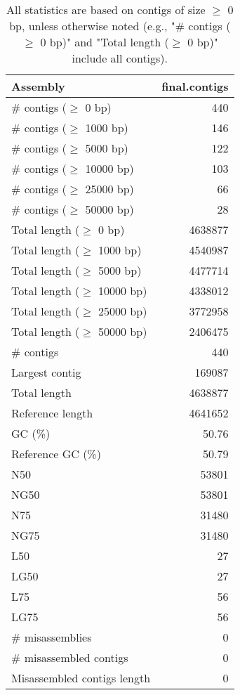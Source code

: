 \documentclass[12pt,a4paper]{article}
\begin{document}
\begin{table}[ht]
\begin{center}
\caption{All statistics are based on contigs of size $\geq$ 0 bp, unless otherwise noted (e.g., "\# contigs ($\geq$ 0 bp)" and "Total length ($\geq$ 0 bp)" include all contigs).}
\begin{tabular}{|l*{1}{|r}|}
\hline
Assembly & final.contigs \\ \hline
\# contigs ($\geq$ 0 bp) & 440 \\ \hline
\# contigs ($\geq$ 1000 bp) & 146 \\ \hline
\# contigs ($\geq$ 5000 bp) & 122 \\ \hline
\# contigs ($\geq$ 10000 bp) & 103 \\ \hline
\# contigs ($\geq$ 25000 bp) & 66 \\ \hline
\# contigs ($\geq$ 50000 bp) & 28 \\ \hline
Total length ($\geq$ 0 bp) & 4638877 \\ \hline
Total length ($\geq$ 1000 bp) & 4540987 \\ \hline
Total length ($\geq$ 5000 bp) & 4477714 \\ \hline
Total length ($\geq$ 10000 bp) & 4338012 \\ \hline
Total length ($\geq$ 25000 bp) & 3772958 \\ \hline
Total length ($\geq$ 50000 bp) & 2406475 \\ \hline
\# contigs & 440 \\ \hline
Largest contig & 169087 \\ \hline
Total length & 4638877 \\ \hline
Reference length & 4641652 \\ \hline
GC (\%) & 50.76 \\ \hline
Reference GC (\%) & 50.79 \\ \hline
N50 & 53801 \\ \hline
NG50 & 53801 \\ \hline
N75 & 31480 \\ \hline
NG75 & 31480 \\ \hline
L50 & 27 \\ \hline
LG50 & 27 \\ \hline
L75 & 56 \\ \hline
LG75 & 56 \\ \hline
\# misassemblies & 0 \\ \hline
\# misassembled contigs & 0 \\ \hline
Misassembled contigs length & 0 \\ \hline

\end{tabular}
\end{center}
\end{table}
\end{document}
